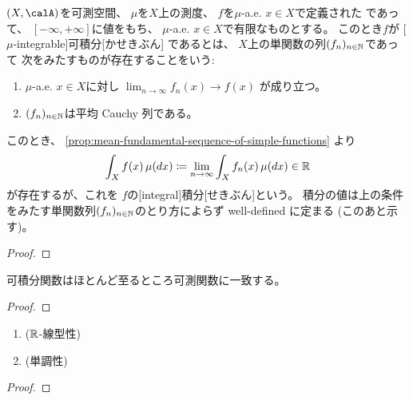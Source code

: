 \documentclass[report]{jlreq}
\begin{document}
\begin{definition}[一般の関数の積分]
    $(X, \calA)$を可測空間、
    $\mu$を$X$上の測度、
    $f$を$\mu$-a.e. $x \in X$で定義された
    であって、
    $[-\infty, +\infty]$に値をもち、
    $\mu$-a.e. $x \in X$で有限なものとする。
    このとき$f$が
    [$\mu$-integrable]{可積分}[かせきぶん]
    であるとは、
    $X$上の単関数の列$(f_n)_{n \in \mathbb{N}}$であって
    次をみたすものが存在することをいう:
    \begin{enumerate}
        \item $\mu$-a.e. $x \in X$に対し
            $\lim_{n \to \infty} f_n(x) \to f(x)$
            が成り立つ。
        \item $(f_n)_{n \in \mathbb{N}}$は平均 Cauchy 列である。
    \end{enumerate}
    このとき、
    \cref{prop:mean-fundamental-sequence-of-simple-functions}
    より
    \begin{equation}
        \int_X f(x) \, \mu(dx)
            \coloneqq \lim_{n \to \infty} \int_X f_n(x) \, \mu(dx)
            \in \mathbb{R}
    \end{equation}
    が存在するが、これを
    $f$の[integral]{積分}[せきぶん]という。
    積分の値は上の条件をみたす単関数列$(f_n)_{n \in \mathbb{N}}$のとり方によらず
    well-defined に定まる (このあと示す)。
\end{definition}

\begin{proof}
    \TODO{}
\end{proof}

\begin{proposition}
    可積分関数はほとんど至るところ可測関数に一致する。
\end{proposition}

\begin{proof}
    \TODO{}
\end{proof}

\begin{proposition}[可積分関数の基本性質]
    \begin{enumerate}
        \item ($\mathbb{R}$-線型性)
        \item (単調性)
    \end{enumerate}
    \TODO{}
\end{proposition}

\begin{proof}
    \TODO{}
\end{proof}
\end{document}
